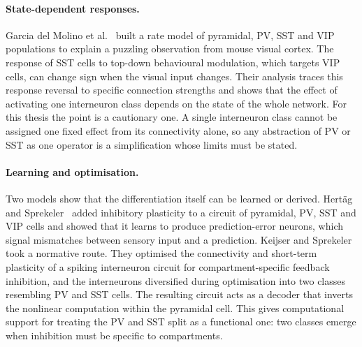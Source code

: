 \paragraph{State-dependent responses.}
Garcia del Molino et al.~\cite{garciadelmolino2017paradoxical} built a rate
model of pyramidal, PV, SST and VIP populations to explain a puzzling
observation from mouse visual cortex. The response of SST cells to top-down
behavioural modulation, which targets VIP cells, can change sign when the
visual input changes. Their analysis traces this response reversal to specific
connection strengths and shows that the effect of activating one interneuron
class depends on the state of the whole network. For this thesis the point is a
cautionary one. A single interneuron class cannot be assigned one fixed effect
from its connectivity alone, so any abstraction of PV or SST as one operator is
a simplification whose limits must be stated.

\paragraph{Learning and optimisation.}
Two models show that the differentiation itself can be learned or derived.
Hertäg and Sprekeler~\cite{hertag2020prediction} added inhibitory plasticity to
a circuit of pyramidal, PV, SST and VIP cells and showed that it learns to
produce prediction-error neurons, which signal mismatches between sensory input
and a prediction. Keijser and Sprekeler~\cite{keijser2022optimizing} took a
normative route. They optimised the connectivity and short-term plasticity of a
spiking interneuron circuit for compartment-specific feedback inhibition, and
the interneurons diversified during optimisation into two classes resembling PV
and SST cells. The resulting circuit acts as a decoder that inverts the
nonlinear computation within the pyramidal cell. This gives computational
support for treating the PV and SST split as a functional one: two classes
emerge when inhibition must be specific to compartments.

